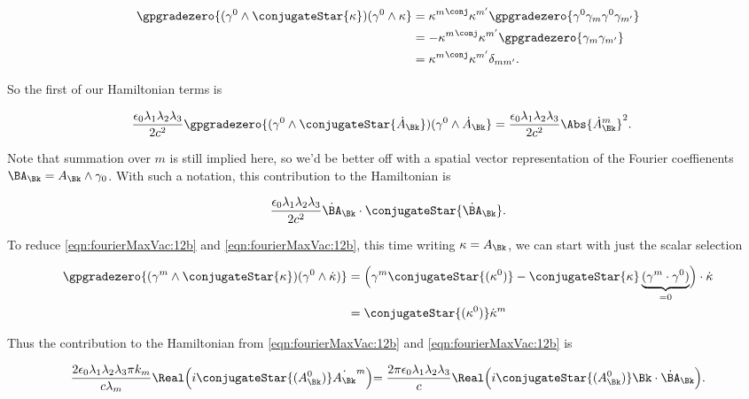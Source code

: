 \begin{align*}
\gpgradezero{ (\gamma^0 \wedge \conjugateStar{\kappa} ) (\gamma^0 \wedge \kappa } 
&=
{\kappa^m}^{\conj} \kappa^{m'}
\gpgradezero{ \gamma^0 \gamma_m \gamma^0 \gamma_{m'} } \\
&=
-{\kappa^m}^{\conj} \kappa^{m'}
\gpgradezero{ \gamma_m \gamma_{m'} }  \\
&=
{\kappa^m}^{\conj} \kappa^{m'}
\delta_{m m'}.
\end{align*}

So the first of our Hamiltonian terms is

\begin{align}\label{eqn:fourierMaxVac:13}
\frac{\epsilon_0 \lambda_1 \lambda_2 \lambda_3}{2 c^2}
\gpgradezero{ (\gamma^0 \wedge \conjugateStar{\dot{A}_\Bk} ) (\gamma^0 \wedge \dot{A}_\Bk } 
&=
\frac{\epsilon_0 \lambda_1 \lambda_2 \lambda_3}{2 c^2}
\Abs{{{\dot{A}}_{\Bk}}^m}^2.
\end{align}

Note that summation over $m$ is still implied here, so we'd be better off with a spatial vector representation of the Fourier coeffienents $\BA_\Bk = A_\Bk \wedge \gamma_0$.  With such a notation, this contribution to the Hamiltonian is

\begin{align}\label{eqn:fourierMaxVac:13b}
\frac{\epsilon_0 \lambda_1 \lambda_2 \lambda_3}{2 c^2} \dot{\BA}_\Bk \cdot \conjugateStar{\dot{\BA}_\Bk}.
\end{align}

To reduce \ref{eqn:fourierMaxVac:12b} and \ref{eqn:fourierMaxVac:12b}, this time writing $\kappa = A_\Bk$, we can start with just the scalar selection

\begin{align*}
\gpgradezero{ (\gamma^m \wedge \conjugateStar{\kappa} ) ( \gamma^0 \wedge \dot{\kappa} ) } 
&=
\Bigl( \gamma^m \conjugateStar{(\kappa^0)} - \conjugateStar{\kappa} \underbrace{(\gamma^m \cdot \gamma^0)}_{=0} \Bigr) \cdot \dot{\kappa} \\
&=
\conjugateStar{(\kappa^0)} \dot{\kappa}^m
\end{align*}

Thus the contribution to the Hamiltonian from \ref{eqn:fourierMaxVac:12b} and \ref{eqn:fourierMaxVac:12b} is

\begin{align}\label{eqn:fourierMaxVac:14}
\frac{2 \epsilon_0 \lambda_1 \lambda_2 \lambda_3 \pi k_m}{c \lambda_m} \Real \Bigl( i \conjugateStar{(A_\Bk^0)} \dot{A_\Bk}^m \Bigl)
=
\frac{2 \pi \epsilon_0 \lambda_1 \lambda_2 \lambda_3}{c} \Real \Bigl( i \conjugateStar{(A_\Bk^0)} \Bk \cdot \dot{\BA}_\Bk \Bigl).
\end{align}

